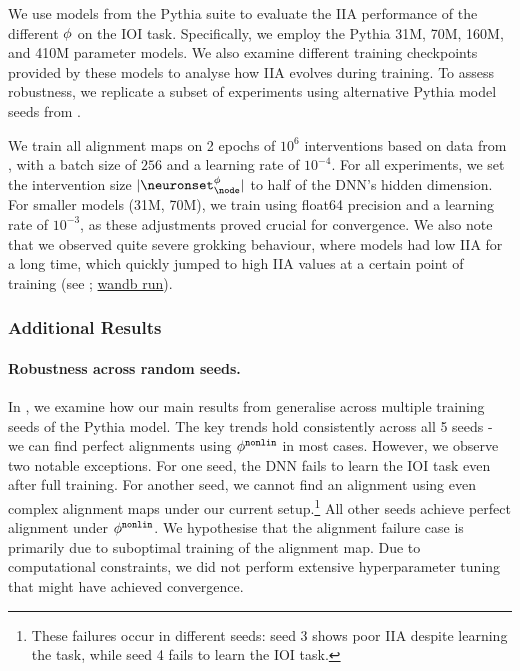 We use models from the Pythia suite \citep{biderman2023pythia} to evaluate the IIA performance of the different $\phi$ on the IOI task. Specifically, we employ the Pythia 31M, 70M, 160M, and 410M parameter models. We also examine different training checkpoints provided by these models to analyse how IIA evolves during training. 
To assess robustness, we replicate a subset of experiments using alternative Pythia model seeds from \citep{wal2025polypythias}.

We train all alignment maps on 2 epochs of $10^6$ interventions based on data from \citet{fahamu_2022}, with a batch size of $256$ and a learning rate of $10^{-4}$. 
For all experiments, we set the intervention size $\interventionsize$ to half of the DNN's hidden dimension.
For smaller models (31M, 70M), we train using float64 precision and a learning rate of $10^{-3}$, as these adjustments proved crucial for convergence. We also note that we observed quite severe grokking behaviour, where models had low IIA for a long time, which quickly jumped to high IIA values at a certain point of training (see ; \href{https://wandb.ai/jkminder/CausalAbstractionLLM/runs/t6bpcgch}{wandb run}).

\subsubsection{Additional Results}
\label{app:ioi_additional_results}

\paragraph{Robustness across random seeds.}
In , we examine how our main results from  generalise across multiple training seeds of the Pythia model. The key trends hold consistently across all 5 seeds - we can find perfect alignments using $\phi^{\mathtt{nonlin}}$ in most cases. However, we observe two notable exceptions. For one seed, the DNN fails to learn the IOI task even after full training. For another seed, we cannot find an alignment using even complex alignment maps under our current setup.\footnote{These failures occur in different seeds: seed 3 shows poor IIA despite learning the task, while seed 4 fails to learn the IOI task.} All other seeds achieve perfect alignment under $\phi^{\mathtt{nonlin}}$. We hypothesise that the alignment failure case is primarily due to suboptimal training of the alignment map. Due to computational constraints, we did not perform extensive hyperparameter tuning that might have achieved convergence.

